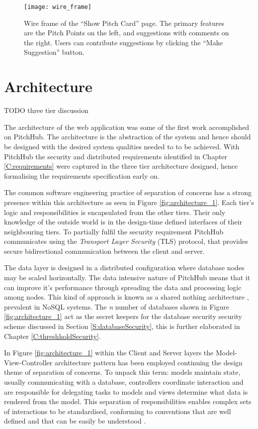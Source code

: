 \begin{figure}[ht]
    \centering
    \texttt{[image: wire\_frame]}
    \caption{Wire frame of the ``Show Pitch Card'' page. The primary features are the Pitch Points on the left, and suggestions with comments on the right. Users can contribute suggestions by clicking the ``Make Suggestion'' button.}
    \label{fig:wire_frame}
\end{figure}

\section{Architecture}
TODO three tier discussion

The architecture of the web application was some of the first work accomplished on PitchHub. The architecture is the abstraction of the system and hence should be designed with the desired system qualities needed to to be achieved. With PitchHub the security and distributed requirements identified in Chapter \ref{C:requirements} were captured in the three tier architecture designed, hence formalising the requirements specification early on.
\par
The common software engineering practice of separation of concerns has a strong presence within this architecture as seen in Figure \ref{fig:architecture_1}. Each tier's logic and responsibilities is encapsulated from the other tiers. Their only knowledge of the outside world is in the design-time defined interfaces of their neighbouring tiers. To partially fulfil the security requirement PitchHub communicates using the \textit{Transport Layer Security} (TLS) protocol, that provides secure bidirectional communication between the client and server.
\par
The data layer is designed in a distributed configuration where database nodes may be scaled horizontally. The data intensive nature of PitchHub means that it can improve it's performance through spreading the data and processing logic among nodes. This kind of approach is known as a shared nothing architecture \cite{stonebraker1986case}, prevalent in NoSQL systems. The \textit{n} number of databases shown in Figure \ref{fig:architecture_1} act as the secret keepers for the database security security scheme discussed in Section \ref{S:databaseSecurity}, this is further elaborated in Chapter \ref{C:threshholdSecurity}.
\par
In Figure \ref{fig:architecture_1} within the Client and Server layers the Model-View-Controller architecture pattern has been employed continuing the design theme of separation of concerns. To unpack this term: models maintain state, usually communicating with a database, controllers coordinate interaction and are responsible for delegating tasks to models and views determine what data is rendered from the model. This separation of responsibilities enables complex sets of interactions to be standardised, conforming to conventions that are well defined and that can be easily be understood \cite{leff2001web}.

